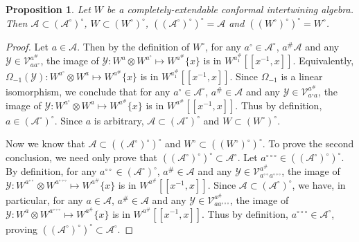 \documentclass{amsproc}
\newtheorem{prop}[thm]{Proposition}
\theoremstyle{definition}
\theoremstyle{remark}
\numberwithin{equation}{section}
\begin{document}
\begin{prop}\label{***=*}
Let $W$ be a completely-extendable conformal intertwining  algebra.
Then $\mathcal{A}\subset 
(\mathcal{A}^{\circ})^{\circ}$,
$W\subset (W^{\circ})^{\circ}$, $((\mathcal{A}^{\circ})^{\circ})^{\circ}=
\mathcal{A}$ and
$((W^{\circ})^{\circ})^{\circ}=W^{\circ}$.
\end{prop}
\begin{proof}
Let $a\in \mathcal{A}$.
Then by the definition of $W^{\circ}$, for any 
$a^{\circ}\in \mathcal{A}^{\circ}$, $a^{\#}\mathcal{A}$ and
any $\mathcal{Y}\in \mathcal{
V}_{aa^{\circ}}^{a^{\#}}$, the image of
$\mathcal{Y}: W^{a}\otimes W^{a^{\circ}}\mapsto W^{a^{\#}}\{x\}$
is in $W^{a^{\#}_{1}}[[x^{-1}, x]]$. Equivalently,
$\Omega_{-1}(\mathcal{Y}): W^{a^{\circ}}\otimes W^{a}\mapsto W^{a^{\#}}\{x\}$
is in $W^{a^{\#}_{1}}[[x^{-1}, x]]$. Since $\Omega_{-1}$ is a linear 
isomorphism, we conclude that for any $a^{\circ}\in \mathcal{A}^{\circ}$,
$a^{\#}\in \mathcal{A}$ and
any $\mathcal{Y}\in \mathcal{
V}_{a^{\circ}a}^{a^{\#}}$, the image of 
$\mathcal{Y}: W^{a^{\circ}}\otimes W^{a}\mapsto W^{a^{\#}}\{x\}$
is in $W^{a^{\#}}[[x^{-1}, x]]$. Thus by definition, $a\in 
(\mathcal{A}^{\circ})^{\circ}$. Since $a$ is arbitrary, $\mathcal{A}\subset 
(\mathcal{A}^{\circ})^{\circ}$ and $W\subset
(W^{\circ})^{\circ}$.

Now we know that $\mathcal{A}\subset 
((\mathcal{A}^{\circ})^{\circ})^{\circ}$ and $W^{\circ}\subset
((W^{\circ})^{\circ})^{\circ}$. To prove the second conclusion, 
we need only prove that $((\mathcal{A}^{\circ})^{\circ})^{\circ}\subset 
\mathcal{A}^{\circ}$. Let $a^{\circ\circ\circ}\in 
((\mathcal{A}^{\circ})^{\circ})^{\circ}$. By definition, 
for any $a^{\circ\circ}\in (\mathcal{A}^{\circ})^{\circ}$, 
$a^{\#}\in \mathcal{A}$ and
any $\mathcal{Y}\in \mathcal{
V}_{a^{\circ\circ}a^{\circ\circ\circ}}^{a^{\#}}$, the image of
$\mathcal{Y}: W^{a^{\circ\circ}}\otimes W^{a^{\circ\circ\circ}}
\mapsto W^{a^{\#}}\{x\}$
is in $W^{a^{\#}}[[x^{-1}, x]]$. Since $\mathcal{A}\subset 
(\mathcal{A}^{\circ})^{\circ}$,
we have, in particular, for any $a\in \mathcal{A}$,
$a^{\#}\in \mathcal{A}$ and
any $\mathcal{Y}\in \mathcal{
V}_{aa^{\circ\circ\circ}}^{a^{\#}}$, the image of
$\mathcal{Y}: W^{a}\otimes W^{a^{\circ\circ\circ}}
\mapsto W^{a^{\#}}\{x\}$
is in $W^{a^{\#}}[[x^{-1}, x]]$. Thus by definition, 
$a^{\circ\circ\circ}\in \mathcal{A}^{\circ}$, proving 
$((\mathcal{A}^{\circ})^{\circ})^{\circ}\subset 
\mathcal{A}^{\circ}$. 
\end{proof}
\end{document}

